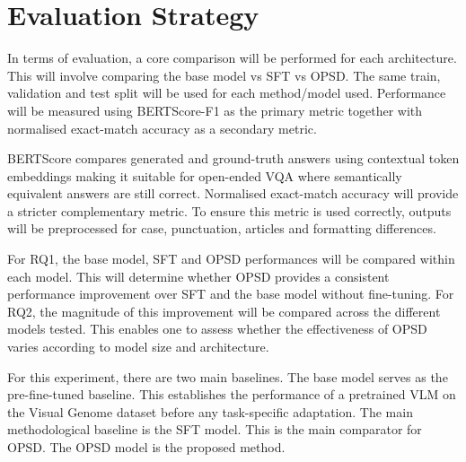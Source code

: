 \section{Evaluation Strategy}

In terms of evaluation, a core comparison will be performed for each architecture. This will involve
comparing the base model vs SFT vs OPSD. The same train, validation and test split will be used
for each method/model used. Performance will be measured using BERTScore-F1 as the primary metric
together with normalised exact-match accuracy as a secondary metric.

BERTScore compares generated and ground-truth answers using contextual token embeddings making it
suitable for open-ended VQA where semantically equivalent answers are still correct. Normalised exact-match 
accuracy will provide a stricter complementary metric. To ensure this metric is used correctly,
outputs will be preprocessed for case, punctuation, articles and formatting differences.

For RQ1, the base model, SFT and OPSD performances will be compared within each model. This will determine
whether OPSD provides a consistent performance improvement over SFT and the base model without fine-tuning. For RQ2,
the magnitude of this improvement will be compared across the different models tested. This enables one to 
assess whether the effectiveness of OPSD varies according to model size and architecture.

For this experiment, there are two main baselines. The base model serves as the pre-fine-tuned baseline.
This establishes the performance of a pretrained VLM on the Visual Genome dataset before any task-specific
adaptation. The main methodological baseline is the SFT model. This is the main comparator for OPSD. The OPSD model
is the proposed method.